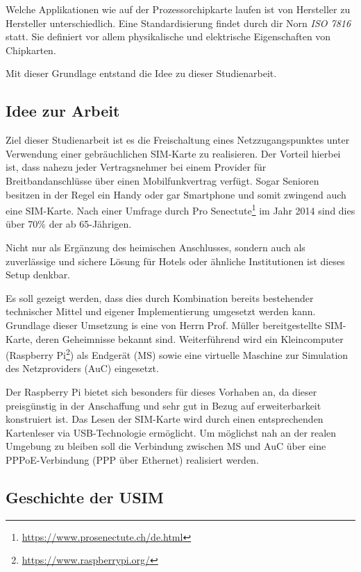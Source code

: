 Welche Applikationen wie auf der Prozessorchipkarte laufen ist von Hersteller zu Hersteller unterschiedlich.
Eine Standardisierung findet durch dir Norn \textit{ISO 7816} statt. Sie definiert vor allem physikalische
und elektrische Eigenschaften von Chipkarten.

Mit dieser Grundlage entstand die Idee zu dieser Studienarbeit.

\subsection{Idee zur Arbeit}
Ziel dieser Studienarbeit ist es die Freischaltung eines Netzzugangspunktes unter Verwendung einer 
gebräuchlichen \ac{SIM}-Karte zu realisieren. Der Vorteil hierbei ist, dass nahezu jeder
Vertragsnehmer bei einem Provider für Breitbandanschlüsse über einen Mobilfunkvertrag verfügt.
Sogar Senioren besitzen in der Regel ein Handy oder gar Smartphone und somit zwingend auch eine
\ac{SIM}-Karte. Nach einer Umfrage durch Pro Senectute\footnote{\url{https://www.prosenectute.ch/de.html}}
im Jahr 2014 sind dies über 70\% der ab 65-Jährigen.

Nicht nur als Ergänzung des heimischen Anschlusses, sondern auch als zuverlässige und sichere Lösung
für Hotels oder ähnliche Institutionen ist dieses Setup denkbar.

Es soll gezeigt werden, dass dies durch Kombination bereits bestehender technischer Mittel und
eigener Implementierung umgesetzt werden kann. Grundlage dieser Umsetzung is eine von Herrn Prof. Müller
bereitgestellte \ac{SIM}-Karte, deren Geheimnisse bekannt sind. Weiterführend wird ein Kleincomputer
(Raspberry Pi\footnote{\url{https://www.raspberrypi.org/}}) als Endgerät (\ac{MS}) sowie eine virtuelle
Maschine zur Simulation des Netzproviders (\ac{AuC}) eingesetzt. 

Der Raspberry Pi bietet sich besonders für dieses Vorhaben an, da dieser preisgünstig in der Anschaffung
und sehr gut in Bezug auf erweiterbarkeit konstruiert ist. Das Lesen der \ac{SIM}-Karte
wird durch einen entsprechenden Kartenleser via USB-Technologie ermöglicht. Um möglichst nah
an der realen Umgebung zu bleiben soll die Verbindung zwischen \ac{MS} und \ac{AuC} über eine
\ac{PPPoE}-Verbindung (\ac{PPP} über Ethernet) realisiert werden.

\subsection{Geschichte der USIM}
\label{geschichte-usim}
\clearpage